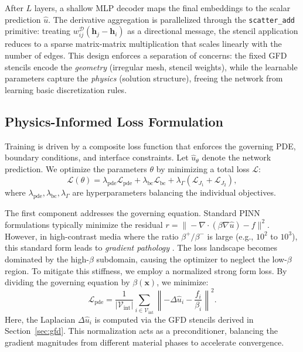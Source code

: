 \documentclass[11pt]{article}
\theoremstyle{definition}
\theoremstyle{remark}
\theoremstyle{plain}
\begin{document}
After $L$ layers, a shallow MLP decoder maps the final embeddings to the scalar prediction $\hat{u}$. The derivative aggregation is parallelized through the \texttt{scatter\_add} primitive: treating $w_{ij}^{\mathcal{D}}(\mathbf{h}_j - \mathbf{h}_i)$ as a directional message, the stencil application reduces to a sparse matrix-matrix multiplication that scales linearly with the number of edges. This design enforces a separation of concerns: the fixed GFD stencils encode the \textit{geometry} (irregular mesh, stencil weights), while the learnable parameters capture the \textit{physics} (solution structure), freeing the network from learning basic discretization rules.

\subsection{Physics-Informed Loss Formulation}
\label{sec:loss}

Training is driven by a composite loss function that enforces the governing PDE, boundary conditions, and interface constraints. Let $\hat{u}_\theta$ denote the network prediction. We optimize the parameters $\theta$ by minimizing a total loss $\mathcal{L}$:
\begin{equation}
    \mathcal{L}(\theta) = \lambda_{\text{pde}} \mathcal{L}_{\text{pde}} + \lambda_{\text{bc}} \mathcal{L}_{\text{bc}} + \lambda_{\Gamma} (\mathcal{L}_{J_1} + \mathcal{L}_{J_2}),
\end{equation}
where $\lambda_{\text{pde}}, \lambda_{\text{bc}}, \lambda_{\Gamma}$ are hyperparameters balancing the individual objectives.

The first component addresses the governing equation. Standard PINN formulations \cite{raissi2019physics} typically minimize the residual $r = \| -\nabla \cdot (\beta \nabla \hat{u}) - f \|^2$. However, in high-contrast media where the ratio $\beta^+ / \beta^-$ is large (e.g., $10^2$ to $10^3$), this standard form leads to \textit{gradient pathology} \cite{wang2021understanding}. The loss landscape becomes dominated by the high-$\beta$ subdomain, causing the optimizer to neglect the low-$\beta$ region. To mitigate this stiffness, we employ a normalized strong form loss. By dividing the governing equation by $\beta(\mathbf{x})$, we minimize:
\begin{equation}
    \mathcal{L}_{\text{pde}} = \frac{1}{|\mathcal{V}_{\text{int}}|} \sum_{i \in \mathcal{V}_{\text{int}}} \left\| -\Delta \hat{u}_i - \frac{f_i}{\beta_i} \right\|^2.
\end{equation}
Here, the Laplacian $\Delta \hat{u}_i$ is computed via the GFD stencils derived in Section~\ref{sec:gfd}. This normalization acts as a preconditioner, balancing the gradient magnitudes from different material phases to accelerate convergence.
\end{document}
